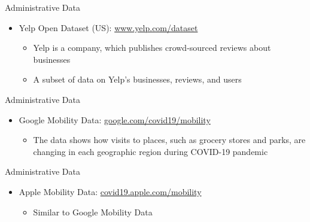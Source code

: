 \documentclass[hyperref={pdfpagelabels=false}]{beamer}
\begin{document}
\begin{frame}{Administrative Data}
\begin{itemize} 
	\item Yelp Open Dataset (US): \href{https://www.yelp.com/dataset}{www.yelp.com/dataset}  
	\vspace{0.3cm}
	\begin{itemize}
		\item Yelp is a company, which publishes crowd-sourced reviews about businesses
			\vspace{0.3cm}
		\item A subset of data on Yelp's businesses, reviews, and users 
	\end{itemize}
	
	
\end{itemize}
\end{frame}



\begin{frame}{Administrative Data}
\begin{itemize} 
	\item Google Mobility Data: \href{https://www.google.com/covid19/mobility/}{google.com/covid19/mobility}  
	\vspace{0.3cm}
	\begin{itemize}
		\item The data shows how visits to places, such as grocery stores and parks, are changing in each geographic region during COVID-19 pandemic
	\end{itemize}
	
	
\end{itemize}
\end{frame}


\begin{frame}{Administrative Data}
\begin{itemize} 
	\item Apple Mobility Data: \href{https://covid19.apple.com/mobility}{covid19.apple.com/mobility}  
	\vspace{0.3cm}
	\begin{itemize}
		\item Similar to Google Mobility Data
	\end{itemize}
	
	
\end{itemize}
\end{frame}
\end{document}
